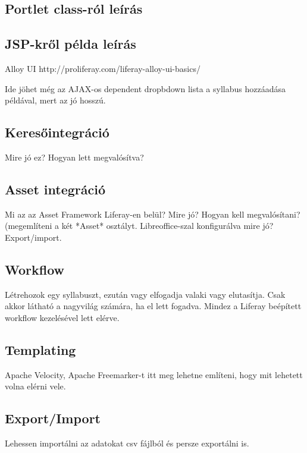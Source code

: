 \documentclass[hidelinks, 12pt, a4paper]{report}
\begin{document}
\subsection{Portlet class-ról leírás}

\subsection{JSP-kről példa leírás}

Alloy UI http://proliferay.com/liferay-alloy-ui-basics/

Ide jöhet még az AJAX-os dependent dropbdown lista a syllabus hozzáadása példával, mert az jó hosszú.

\subsection{Keresőintegráció}

Mire jó ez? Hogyan lett megvalósítva?

\subsection{Asset integráció}

Mi az az Asset Framework Liferay-en belül? Mire jó? Hogyan kell megvalósítani? (megemlíteni a két *Asset* osztályt.
Libreoffice-szal konfigurálva mire jó? Export/import.

\subsection{Workflow}

Létrehozok egy syllabuszt, ezután vagy elfogadja valaki vagy elutasítja. Csak akkor látható a nagyvilág számára, ha el lett fogadva. Mindez a Liferay beépített workflow kezelésével lett elérve.

\subsection{Templating}

Apache Velocity, Apache Freemarker-t itt meg lehetne említeni, hogy mit lehetett volna elérni vele.

\subsection{Export/Import}

Lehessen importálni az adatokat csv fájlból és persze exportálni is.
\end{document}

